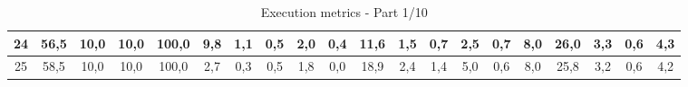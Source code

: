 \begin{sidewaystable}[]
\begin{tabular}{|c|c|c|c|c|c|c|c|c|c|c|c|c|c|c|c|c|c|c|c|}
    24 & 56,5                                            & 10,0                                            & 10,0                                            & 100,0                                           & 9,8                                             & 1,1                                             & 0,5                                             & 2,0                                             & 0,4                                             & 11,6                                             & 1,5                                              & 0,7                                              & 2,5                                              & 0,7                                              & 8,0                                              & 26,0                                             & 3,3                                              & 0,6                                              & 4,3                                              \\ \hline
    25 & 58,5                                            & 10,0                                            & 10,0                                            & 100,0                                           & 2,7                                             & 0,3                                             & 0,5                                             & 1,8                                             & 0,0                                             & 18,9                                             & 2,4                                              & 1,4                                              & 5,0                                              & 0,6                                              & 8,0                                              & 25,8                                             & 3,2                                              & 0,6                                              & 4,2                                              \\ \hline
    \end{tabular}
    \caption{Execution metrics - Part 1/10}
    \label{tab:ap:exec_metrics_1}
\end{sidewaystable}

